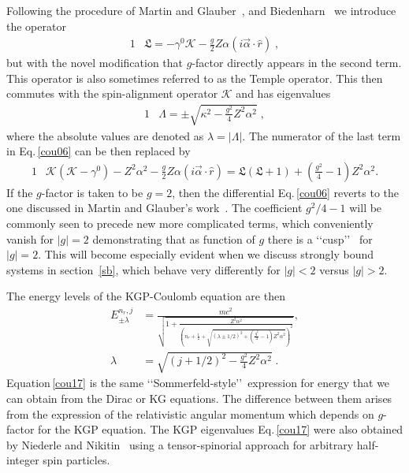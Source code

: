 Following the procedure of Martin and Glauber~\cite{Martin:1958zz}, and Biedenharn~\cite{bi62} we introduce the operator
\begin{alignat}{1}
\label{cou07} &\mathfrak{L}=-\gamma^{0}\mathcal{K}-\frac{g}{2}Z\alpha(i\vec{\alpha}\cdot\hat{r})\;,
\end{alignat}
but with the novel modification that $g$-factor directly appears in the second term. This operator is also sometimes referred to as the Temple operator. This then commutes with the spin-alignment operator $\mathcal{K}$ and has eigenvalues
\begin{alignat}{1}
\label{cou08} &\Lambda=\pm\sqrt{\kappa^{2}-\displaystyle\frac{\displaystyle g^{2}}{4}Z^{2}\alpha^{2}}\;,\end{alignat}
where the absolute values are denoted as $\lambda=|\Lambda|$. The numerator of the last term in Eq.\,\eqref{cou06} can be then replaced by
\begin{alignat}{1}
\label{cou09} &\mathcal{K}(\mathcal{K}-\gamma^{0})-Z^{2}\alpha^{2}-\frac{g}{2}Z\alpha(i\vec{\alpha}\cdot\hat{r})=\mathfrak{L}(\mathfrak{L}+1)+\left(\frac{g^{2}}{4}-1\right)Z^{2}\alpha^{2}.
\end{alignat}
If the $g$-factor is taken to be $g=2$, then the differential Eq.\,\eqref{cou06} reverts to the one discussed in Martin and Glauber\rq s work~\cite{Martin:1958zz}. The coefficient $g^{2}/4-1$ will be commonly seen to precede new more complicated terms, which conveniently vanish for $|g|=2$ demonstrating that as function of $g$ there is a \lq\lq cusp\rq\rq~\cite{Rafelski:2012ui} for $|g|=2$. This will become especially evident when we discuss strongly bound systems in section~\ref{sb}, which behave very differently for $|g|<2$ versus $|g|>2$. 

The energy levels of the KGP-Coulomb equation are then
\begin{subequations}
\begin{alignat}{1}
\label{cou17} E_{\pm\lambda}^{n_{r},j}&=\frac{mc^{2}}{\sqrt{1+\displaystyle\frac{Z^{2}\alpha^{2}}{\left(n_{r}+\frac{1}{2}+\sqrt{(\lambda\pm1/2)^{2}+\left(\frac{g^{2}}{4}-1\right)Z^{2}\alpha^{2}}\right)^{2}}}},\\[0.2cm]
\label{cou17c} \lambda&=\sqrt{\displaystyle(j+1/2)^{2}-\frac{\displaystyle g^{2}}{4}Z^{2}\alpha^{2}}\;.
\end{alignat}
\end{subequations}
Equation\,\eqref{cou17} is the same \lq\lq Sommerfeld-style\rq\rq\ expression for energy that we can obtain from the Dirac or KG equations. The difference between them arises from the expression of the relativistic angular momentum which depends on $g$-factor for the KGP equation. The KGP eigenvalues Eq.\,\eqref{cou17} were also obtained by Niederle and Nikitin~\cite{Niederle:2004bx} using a tensor-spinorial approach for arbitrary half-integer spin particles.

